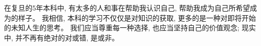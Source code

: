 \documentclass[a4paper, 12pt]{book}
\author{Yizhan Miao $<$\href{mailto:yzmiao@pm.me}{yzmiao@pm.me}$>$}
\begin{document}
\setlength{\baselineskip}{20pt}  %

% 
%
% 
%
% 
%
% 


\thispagestyle{empty}

\frontmatter

{}
\tableofcontents




\mainmatter















\backmatter
\setlength{\baselineskip}{15pt}
{}



\setlength{\baselineskip}{20pt}  %



在复旦的5年本科中, 有太多的人和事在帮助我认识自己, 帮助我成为自己所希望成为的样子。
我相信, 本科的学习不仅仅是对知识的获取, 更多的是一种对即将开始的未知人生的思考。
我们应当尊重每一种选择, 也应当坚持自己的价值观念;
现实中, 并不再有绝对的对或错, 是或非。
\end{document}
